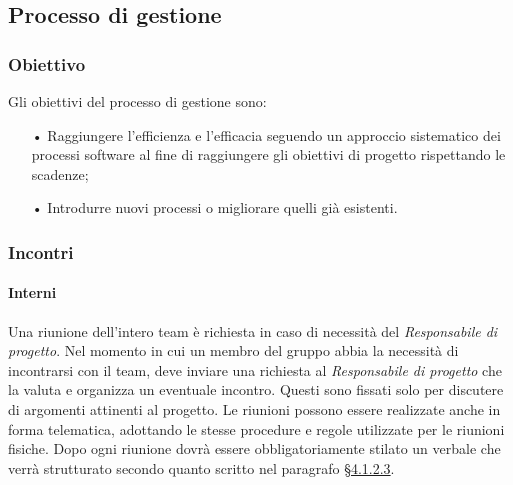 \subsection{Processo di gestione}
\subsubsection{Obiettivo}
Gli obiettivi del processo di gestione sono:
\begin{itemize}
\item[•] Raggiungere l’efficienza e l’efficacia seguendo un approccio sistematico dei processi software al fine di raggiungere gli obiettivi di progetto rispettando le scadenze;
\item[•] Introdurre nuovi processi o migliorare quelli già esistenti.
\end{itemize}

\subsubsection{Incontri}

\paragraph{Interni}
\label{sec:interni}
Una riunione dell'intero team è richiesta in caso di necessità del \textit{Responsabile di progetto}. Nel momento in cui un membro del gruppo abbia la necessità di incontrarsi con il team, deve inviare una richiesta al \textit{Responsabile di progetto} che la valuta e organizza un eventuale incontro. Questi sono fissati solo per discutere di argomenti attinenti al progetto.
Le riunioni possono essere realizzate anche in forma {telematica}, adottando le stesse procedure e regole utilizzate per le riunioni fisiche.
Dopo ogni riunione dovrà essere obbligatoriamente stilato un verbale che verrà strutturato secondo quanto scritto nel paragrafo \hyperref[sec:verbali]{§4.1.2.3}.
